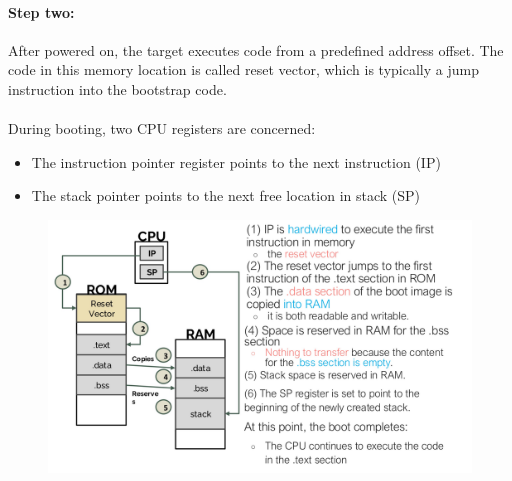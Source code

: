   

\paragraph{Step two: }

After powered on,
the target executes code from a predefined address offset. The code in this memory location is called reset vector,
which is typically a jump instruction into the bootstrap code.

\paragraph{}
During booting, two CPU registers are concerned:

\begin{itemize}
    \item The instruction pointer register points to the next instruction (IP)
    \item The stack pointer points to the next free location in stack (SP)
\end{itemize}


\begin{figure}[H]
    \centering
    \includegraphics[width=0.9\linewidth]{img/image37.png}
\end{figure}
